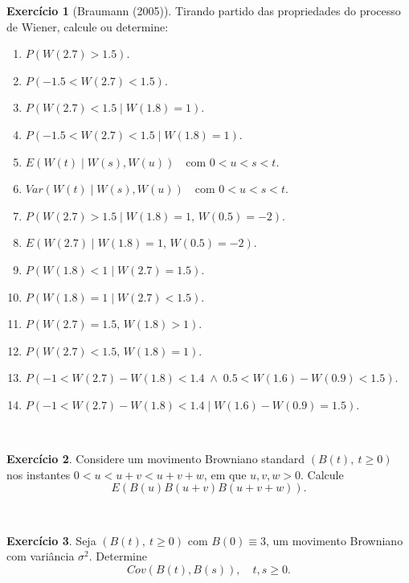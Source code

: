 \documentclass[
  11pt,
  a4paper,
]{book}
\theoremstyle{definition}
\theoremstyle{definition}
\theoremstyle{definition}
\newtheorem{exercise}{Exercício}[chapter]
\theoremstyle{definition}
\theoremstyle{remark}
\begin{document}
\begin{exercise}[Braumann (2005)]

Tirando partido das propriedades do processo de Wiener, calcule ou determine:

\begin{enumerate}
\def\labelenumi{\arabic{enumi}.}
\item
  \(P(W(2.7) > 1.5)\).
\item
  \(P(-1.5 < W(2.7) < 1.5)\).
\item
  \(P(W(2.7) < 1.5 \mid W(1.8) = 1)\).
\item
  \(P(-1.5 < W(2.7) < 1.5 \mid W(1.8) = 1)\).
\item
  \(E(W(t) \mid W(s), W(u)) \quad \text{com } 0 < u < s < t\).
\item
  \(Var(W(t) \mid W(s), W(u)) \quad \text{com } 0 < u < s < t\).
\item
  \(P(W(2.7) > 1.5 \mid W(1.8) = 1,\, W(0.5) = -2)\).
\item
  \(E(W(2.7) \mid W(1.8) = 1,\, W(0.5) = -2)\).
\item
  \(P(W(1.8) < 1 \mid W(2.7) = 1.5)\).
\item
  \(P(W(1.8) = 1 \mid W(2.7) < 1.5)\).
\item
  \(P(W(2.7) = 1.5,\, W(1.8) > 1)\).
\item
  \(P(W(2.7) < 1.5,\, W(1.8) = 1)\).
\item
  \(P(-1 < W(2.7) - W(1.8) < 1.4 \;\wedge\; 0.5 < W(1.6) - W(0.9) < 1.5)\).
\item
  \(P(-1 < W(2.7) - W(1.8) < 1.4 \mid W(1.6) - W(0.9) = 1.5)\).
\end{enumerate}

\end{exercise}

\(\,\)

\begin{exercise}
\leavevmode

Considere um movimento Browniano standard \((B(t), ~t\geq 0)\) nos instantes \(0<u<u+v<u+v+w\), em que \(u,v,w>0\). Calcule
\[
E(B(u)B(u+v)B(u+v+w)).
\]

\end{exercise}

\(\,\)

\begin{exercise}
\leavevmode

Seja \((B(t), ~t\geq 0)\) com \(B(0)\equiv 3\), um movimento Browniano com variância \(\sigma^{2}\). Determine
\[
Cov(B(t),B(s)), \quad t,s \geq 0.
\]

\end{exercise}
\end{document}
